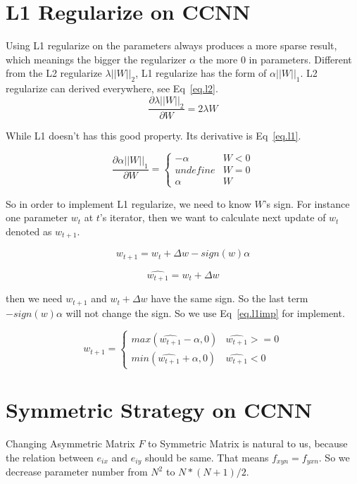 \documentclass[12pt]{article}
\begin{document}
\section{L1 Regularize on CCNN}
Using L1 regularize on the parameters always produces a more sparse result, which meanings the bigger the regularizer $\alpha$ the more 0 in parameters. Different from the L2 regularize $\lambda || W ||_2$, L1 regularize has the form of $\alpha || W ||_1$. L2 regularize can derived everywhere, see Eq~\ref{eq.l2}. 
\begin{equation}
\frac{\partial{\lambda || W ||_2}}{\partial W} = 2 \lambda W \label{eq.l2}
\end{equation}

While L1 doesn't has this good property. Its derivative is Eq~\ref{eq.l1}.

\begin{equation}
\frac{\partial{\alpha || W ||_1}}{\partial W} = \left \{ 
\begin{array}{ll}
-\alpha & W<0 \\
undefine & W=0 \\
\alpha & W
\end{array} \right . \label{eq.l1}
\end{equation}

So in order to implement L1 regularize, we need to know $W$'s sign. For instance one parameter $w_t$ at $t$'s iterator, then we want to calculate next update of $w_t$ denoted as $w_{t+1}$. 

\begin{equation}
w_{t+1} = w_t + \Delta w - sign(w) \alpha
\end{equation}

\begin{equation}
\hat{w_{t+1}} = w_t + \Delta w
\end{equation}

then we need $w_{t+1}$ and $w_t + \Delta w$ have the same sign. So the last term $-sign(w) \alpha$ will not change the sign. So we use Eq~\ref{eq.l1imp} for implement.

\begin{equation}
w_{t+1} = \left \{
\begin{array}{ll}
max(\hat{w_{t+1}}-\alpha, 0) & \hat{w_{t+1}}>=0 \\
min(\hat{w_{t+1}}+\alpha, 0) & \hat{w_{t+1}}<0
\end{array}
\right .
\label{eq.l1imp}
\end{equation}

\section{Symmetric Strategy on CCNN}
Changing Asymmetric Matrix $F$ to Symmetric Matrix is natural to us, because the relation between $e_{ix}$ and $e_{iy}$ should be same. That means $f_{xyn}=f_{yxn}$. So we decrease parameter number from $N^2$ to $N*(N+1)/2$.
\end{document}
